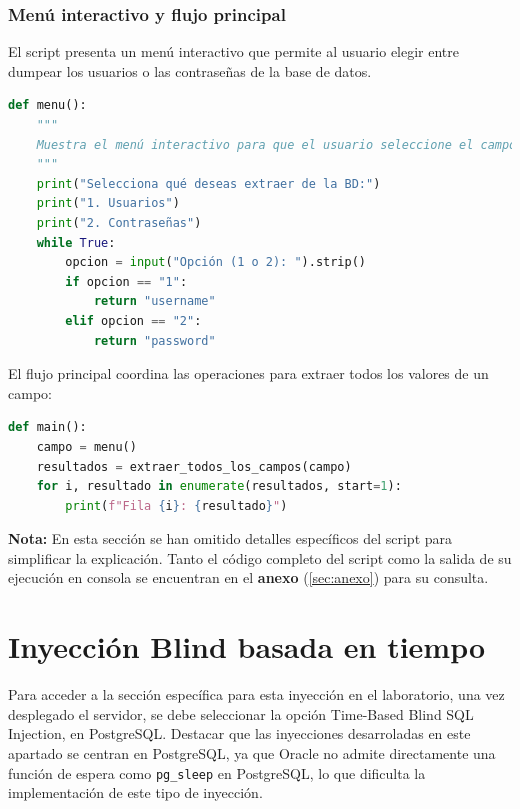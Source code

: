 \documentclass[a4paper,12pt]{article}
\begin{document}
\subsubsection{Menú interactivo y flujo principal}

El script presenta un menú interactivo que permite al usuario elegir entre dumpear los usuarios o las contraseñas de la base de datos.

\begin{lstlisting}[language=Python]
def menu():
    """
    Muestra el menú interactivo para que el usuario seleccione el campo a extraer.
    """
    print("Selecciona qué deseas extraer de la BD:")
    print("1. Usuarios")
    print("2. Contraseñas")
    while True:
        opcion = input("Opción (1 o 2): ").strip()
        if opcion == "1":
            return "username"
        elif opcion == "2":
            return "password"
\end{lstlisting}

El flujo principal coordina las operaciones para extraer todos los valores de un campo:

\begin{lstlisting}[language=Python]
def main():
    campo = menu()
    resultados = extraer_todos_los_campos(campo)
    for i, resultado in enumerate(resultados, start=1):
        print(f"Fila {i}: {resultado}")
\end{lstlisting}

\textbf{Nota:} En esta sección se han omitido detalles específicos del script para simplificar la explicación. Tanto el código completo del script como la salida de su ejecución en consola se encuentran en el \textbf{anexo} (\ref{sec:anexo}) para su consulta.




\section{Inyección Blind basada en tiempo}

Para acceder a la sección específica para esta inyección en el laboratorio, una vez desplegado
el servidor, se debe seleccionar la opción Time-Based Blind SQL Injection, en
PostgreSQL. Destacar que las inyecciones desarroladas en este apartado se centran en PostgreSQL, ya que Oracle no admite directamente una
función de espera como \texttt{pg\_sleep} en PostgreSQL, lo que dificulta la implementación de este tipo de inyección.
\end{document}
